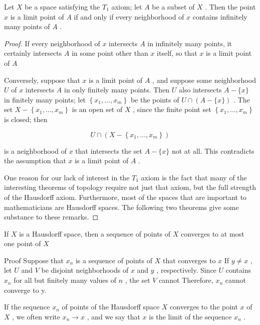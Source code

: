 \begin{theorem} Let \(X\) be a space satisfying the \({T}_{1}\) axiom; let \(A\) be a subset of \(X\) . Then the point \(x\) is a limit point of \(A\) if and only if every neighborhood of \(x\) contains infinitely many points of \(A\) .

\end{theorem}
\begin{proof}
If every neighborhood of \(x\) intersects \(A\) in infinitely many points, it certainly intersects \(A\) in some point other than \(x\) itself, so that \(x\) is a limit point of \(A\)

Conversely, suppose that \(x\) is a limit point of \(A\) , and suppose some neighborhood \(U\) of \(x\) intersects \(A\) in only finitely many points. Then \(U\) also intersects \(A - \{ x\}\) in finitely many points; let \(\left\{  {{x}_{1},\ldots ,{x}_{m}}\right\}\) be the points of \(U \cap  \left( {A-\{ x\} }\right)\) . The set \(X - \left\{  {{x}_{1},\ldots ,{x}_{m}}\right\}\) is an open set of \(X\) , since the finite point set \(\left\{  {{x}_{1},\ldots ,{x}_{m}}\right\}\) is closed; then

\[
U \cap  \left( {X - \left\{  {{x}_{1},\ldots ,{x}_{m}}\right\}  }\right)
\]

is a neighborhood of \(x\) that intersects the set \(A - \{ x\}\) not at all. This contradicts the assumption that \(x\) is a limit point of \(A\) .

One reason for our lack of interest in the \({T}_{1}\) axiom is the fact that many of the interesting theorems of topology require not just that axiom, but the full strength of the Hausdorff axiom. Furthermore, most of the spaces that are important to mathematicians are Hausdorff spaces. The following two theorems give some substance to these remarks.
\end{proof}

\begin{theorem} If \(X\) is a Hausdorff space, then a sequence of points of \(X\) converges to at most one point of \(X\)

\end{theorem}
Proof Suppose that \({x}_{n}\) is a sequence of points of \(X\) that converges to \(x\) If \(y \neq  x\) , let \(U\) and \(V\) be disjoint neighborhoods of \(x\) and \(y\) , respectively. Since \(U\) contains \({x}_{n}\) for all but finitely many values of \(n\) , the set \(V\) cannot Therefore, \({x}_{n}\) cannot converge to y.

If the sequence \({x}_{n}\) of points of the Hausdorff space \(X\) converges to the point \(x\) of \(X\) , we often write \({x}_{n} \rightarrow  x\) , and we say that \(x\) is the limit of the sequence \({x}_{n}\) .

